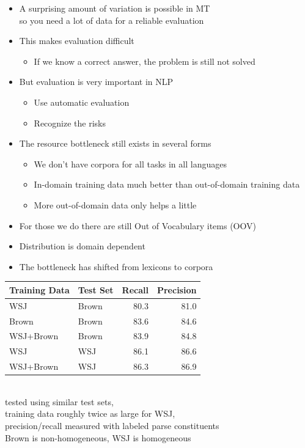 \documentclass[a4paper,landscape,headrule,footrule,dvips]{foils}
\begin{document}
\begin{CJK}{UTF8}{min}
\begin{itemize}
\item A surprising amount of variation is possible in MT
  \\ so you need a lot of data for a reliable evaluation
\item This makes evaluation difficult
  \begin{itemize}
  \item If we know a correct answer, the problem is still not solved
  \end{itemize}
\item But evaluation is very important in NLP
  \begin{itemize}
  \item Use automatic evaluation
  \item Recognize the risks
  \end{itemize}
\end{itemize}



\begin{itemize}
\item The resource bottleneck still exists in several forms
  \begin{itemize}
  \item We don't have corpora for all tasks in all languages
  \item In-domain training data much better than out-of-domain training data
  \item More out-of-domain data only helps a little
  \end{itemize}
\item For those we do there are still Out of Vocabulary items (OOV)
\item Distribution is domain dependent
\item The bottleneck has shifted from lexicons to corpora
\end{itemize}


\begin{center}
  \begin{tabular}{ll|rr}
    Training Data & Test Set & Recall & Precision \\
    \hline
    WSJ & Brown &   80.3 & 81.0 \\
    Brown & Brown & 83.6 & 84.6 \\ 
    WSJ+Brown & Brown & 83.9 & 84.8 \\ 
    WSJ & WSJ & 86.1 & 86.6 \\
    WSJ+Brown & WSJ & 86.3 & 86.9 \\ 
  \end{tabular}
  \\[2ex] tested using similar test sets, 
  \\ training data roughly twice as large for WSJ, 
  \\ precision/recall measured with labeled parse constituents
  \\ Brown is non-homogeneous, WSJ is homogeneous
\end{center}


\end{CJK}
\end{document}
